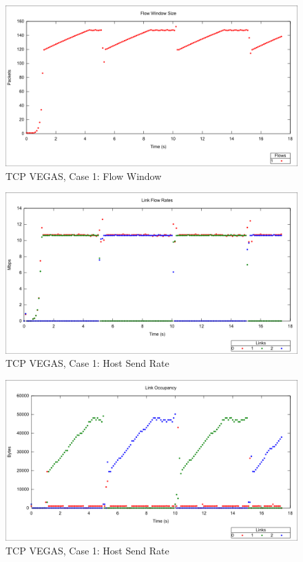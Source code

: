 \begin{figure}[htbp]
    \centering
    \includegraphics[width=\textwidth]{vegas1/Flow_Window.png}
    \caption{TCP VEGAS, Case 1: Flow Window}
\end{figure}


\begin{figure}[htbp]
    \centering
    \includegraphics[width=\textwidth]{vegas1/Link_Flow_Rate.png}
    \caption{TCP VEGAS, Case 1: Host Send Rate}
\end{figure}

\begin{figure}[htbp]
    \centering
    \includegraphics[width=\textwidth]{vegas1/Link_Occupancy.png}
    \caption{TCP VEGAS, Case 1: Host Send Rate}
\end{figure}

